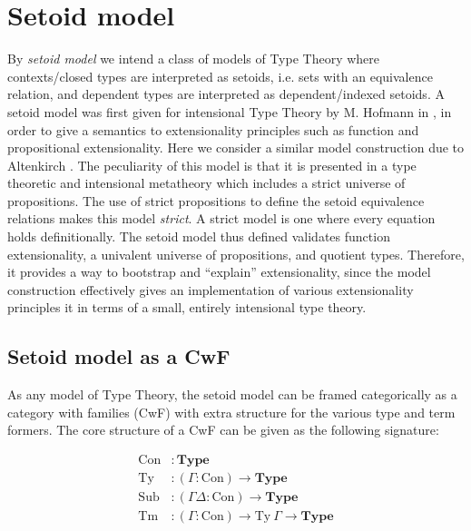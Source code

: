 \documentclass{easychair}
\newcommand{\GG}{\Gamma}
\newcommand{\GD}{\Delta}
\newcommand{\mType}{\mathbf{Type}}
\newcommand{\Con}{\mathrm{Con}}
\newcommand{\Ty}{\mathrm{Ty}}
\newcommand{\Tm}{\mathrm{Tm}}
\newcommand{\Sub}{\mathrm{Sub}}
\begin{document}
\section{Setoid model}\label{setoid-model}


By \emph{setoid model} we intend a class of models of Type Theory where
contexts/closed types are interpreted as setoids, i.e. sets with an equivalence
relation, and dependent types are interpreted as dependent/indexed setoids.
%
A setoid model was first given for intensional Type Theory by M. Hofmann in
\cite{hofmann-ext-int}, in order to give a semantics to extensionality
principles such as function and propositional extensionality. Here we consider
a similar model construction due to Altenkirch \cite{setoid-model}.
%
The peculiarity of this model is that it is presented in a type theoretic and
intensional metatheory which includes a strict universe of propositions.
%
The use of strict propositions to define the setoid equivalence relations makes
this model \emph{strict}. A strict model is one where every equation holds
definitionally. The setoid model thus defined validates function extensionality,
a univalent universe of propositions, and quotient types. Therefore, it provides
a way to bootstrap and ``explain'' extensionality, since the model construction
effectively gives an implementation of various extensionality principles it in
terms of a small, entirely intensional type theory.

\subsection{Setoid model as a CwF}

As any model of Type Theory, the setoid model can be framed categorically as a
category with families (CwF) with extra structure for the various type and term
formers. The core structure of a CwF can be given as the following signature:

\begin{align*}
  \Con &: \mType \\
  \Ty &: (\GG : \Con) \to \mType \\
  \Sub &: (\GG \GD : \Con) \to \mType \\
  \Tm &: (\GG : \Con) \to \Ty\ \GG \to \mType
\end{align*}
\end{document}
